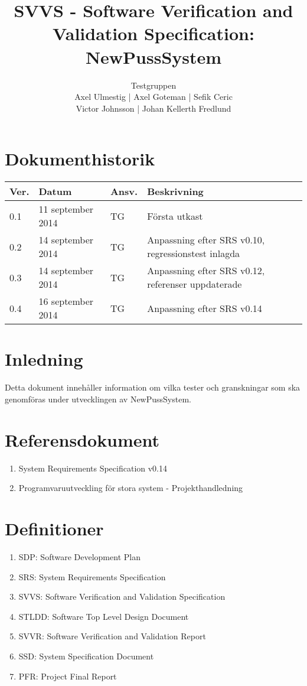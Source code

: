 \documentclass[a4paper]{article}
\title{SVVS - Software Verification and Validation Specification: NewPussSystem}
\author{Testgruppen \\ Axel Ulmestig | Axel Goteman | Sefik Ceric \\ Victor Johnsson | Johan Kellerth Fredlund}
\date{}
\begin{document}
\maketitle
\thispagestyle{fancy}
\tableofcontents
\newpage

\section*{Dokumenthistorik}

\begin{tabular}{ l l l l }
Ver. & Datum & Ansv. & Beskrivning \\\hline
0.1 & 11 september 2014 & TG & Första utkast \\
0.2 & 14 september 2014 & TG & Anpassning efter SRS v0.10, regressionstest inlagda \\
0.3 & 14 september 2014 & TG & Anpassning efter SRS v0.12, referenser uppdaterade\\
0.4 & 16 september 2014 & TG & Anpassning efter SRS v0.14

\end{tabular}
\section{Inledning}       

Detta dokument innehåller information om vilka tester och granskningar som ska genomföras under utvecklingen av NewPussSystem.

\section{Referensdokument}
\begin{enumerate}
\item System Requirements Specification v0.14
\item Programvaruutveckling för stora system - Projekthandledning
\end{enumerate}

\section{Definitioner}

\begin{enumerate}

\item SDP: Software Development Plan

\item SRS: System Requirements Specification

\item SVVS: Software Verification and Validation Specification

\item STLDD: Software Top Level Design Document

\item SVVR: Software Verification and Validation Report

\item SSD: System Specification Document

\item PFR: Project Final Report


\end{enumerate}
\end{document}
